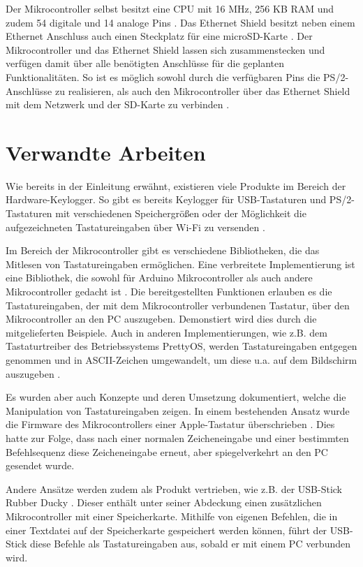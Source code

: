 Der Mikrocontroller selbst besitzt eine CPU mit 16 MHz, 256 KB RAM und zudem 54 digitale und 14 analoge Pins \cite{arduino_mega}. Das Ethernet Shield besitzt neben einem Ethernet Anschluss auch einen Steckplatz für eine microSD-Karte \cite{arduino_ethernet}. Der Mikrocontroller und das Ethernet Shield lassen sich zusammenstecken und verfügen damit über alle benötigten Anschlüsse für die geplanten Funktionalitäten. So ist es möglich sowohl durch die verfügbaren Pins die PS/2-Anschlüsse zu realisieren, als auch den Mikrocontroller über das Ethernet Shield mit dem Netzwerk und der SD-Karte zu verbinden \cite{arduino_mega} \cite{arduino_ethernet}.



\section{Verwandte Arbeiten}
Wie bereits in der Einleitung erwähnt, existieren viele Produkte im Bereich der Hardware-Keylogger. So gibt es bereits Keylogger für USB-Tastaturen und PS/2-Tastaturen mit verschiedenen Speichergrößen oder der Möglichkeit die aufgezeichneten Tastatureingaben über Wi-Fi zu versenden \cite{keelog}.

Im Bereich der Mikrocontroller gibt es verschiedene Bibliotheken, die das Mitlesen von Tastatureingaben ermöglichen. Eine verbreitete Implementierung ist eine Bibliothek, die sowohl für Arduino Mikrocontroller als auch andere Mikrocontroller gedacht ist \cite{ps2keyboard}. Die bereitgestellten Funktionen erlauben es die Tastatureingaben, der mit dem Mikrocontroller verbundenen Tastatur, über den Mikrocontroller an den PC auszugeben. Demonstiert wird dies durch die mitgelieferten Beispiele. Auch in anderen Implementierungen, wie z.B. dem Tastaturtreiber des Betriebssystems PrettyOS, werden Tastatureingaben entgegen genommen und in ASCII-Zeichen umgewandelt, um diese u.a. auf dem Bildschirm auszugeben \cite{prettyos}.

Es wurden aber auch Konzepte und deren Umsetzung dokumentiert, welche die Manipulation von Tastatureingaben zeigen. In einem bestehenden Ansatz wurde die Firmware des Mikrocontrollers einer Apple-Tastatur überschrieben \cite{chen}. Dies hatte zur Folge, dass nach einer normalen Zeicheneingabe und einer bestimmten Befehlsequenz diese Zeicheneingabe erneut, aber spiegelverkehrt an den PC gesendet wurde.

Andere Ansätze werden zudem als Produkt vertrieben, wie z.B. der USB-Stick Rubber Ducky \cite{ducky}. Dieser enthält unter seiner Abdeckung einen zusätzlichen Mikrocontroller mit einer Speicherkarte. Mithilfe von eigenen Befehlen, die in einer Textdatei auf der Speicherkarte gespeichert werden können, führt der USB-Stick diese Befehle als Tastatureingaben aus, sobald er mit einem PC verbunden wird.

